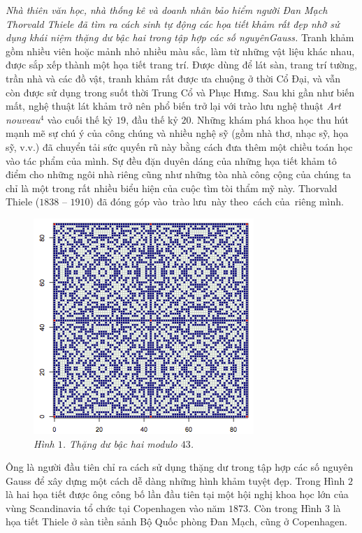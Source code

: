\vspace*{165pt}
\begin{multicols}{2}
	\textit{Nhà thiên văn học, nhà thống kê và doanh nhân bảo hiểm người Đan Mạch Thorvald Thiele đã tìm ra cách sinh tự động các họa tiết khảm rất đẹp nhờ sử dụng khái niệm thặng dư bậc hai trong tập hợp các số nguyên\linebreak Gauss.}
	\vskip 0.1cm
	Tranh khảm gồm nhiều viên hoặc mảnh nhỏ nhiều màu sắc, làm từ những vật liệu khác nhau, được sắp xếp thành một họa tiết trang trí. Được dùng để lát sàn, trang trí tường, trần nhà và các đồ vật, tranh khảm rất được ưa chuộng ở thời Cổ Đại, và vẫn còn được sử dụng trong suốt thời Trung Cổ và Phục Hưng.
	\vskip 0.1cm
	Sau khi gần như biến mất, nghệ thuật lát khảm trở nên phổ biến trở lại với trào lưu nghệ thuật \textit{Art nouveau$^4$}  vào cuối thế kỷ $19$, đầu thế kỷ $20$. Những khám phá khoa học thu hút mạnh mẽ sự chú ý của công chúng và nhiều nghệ sỹ (gồm nhà thơ, nhạc sỹ, họa sỹ, v.v.) đã chuyển tải sức quyến rũ này bằng cách đưa thêm một chiều toán học vào tác phẩm của mình. Sự đều đặn duyên dáng của những họa tiết khảm tô điểm cho những ngôi nhà riêng cũng như những tòa nhà công cộng của chúng ta chỉ là một trong rất nhiều biểu hiện của cuộc tìm tòi thẩm mỹ này.
	\vskip 0.1cm
	Thorvald Thiele ($1838$ -- $1910$) đã đóng góp vào\, trào lưu\, này theo\, cách của\, riêng mình.
	\begin{figure}[H]
		\vspace*{-5pt}
		\centering
		\captionsetup{labelformat= empty, justification=centering}
		\includegraphics[width= 0.5\linewidth]{mosaique-1.png}
		\caption{\small\textit{\color{toanhocdoisong}Hình $1$. Thặng dư bậc hai modulo $43$.}}
		\vspace*{-10pt}
	\end{figure}
	Ông là người đầu tiên chỉ ra cách sử dụng thặng dư trong tập hợp các số nguyên Gauss để xây dựng một cách dễ dàng những hình khảm tuyệt đẹp. Trong Hình $2$ là hai họa tiết được ông công bố lần đầu tiên tại một hội nghị khoa học lớn của vùng Scandinavia tổ chức tại Copenhagen vào năm $1873$. Còn trong Hình $3$ là họa tiết Thiele ở sàn tiền sảnh Bộ Quốc phòng Đan Mạch, cũng ở Copenhagen.

\end{multicols}
